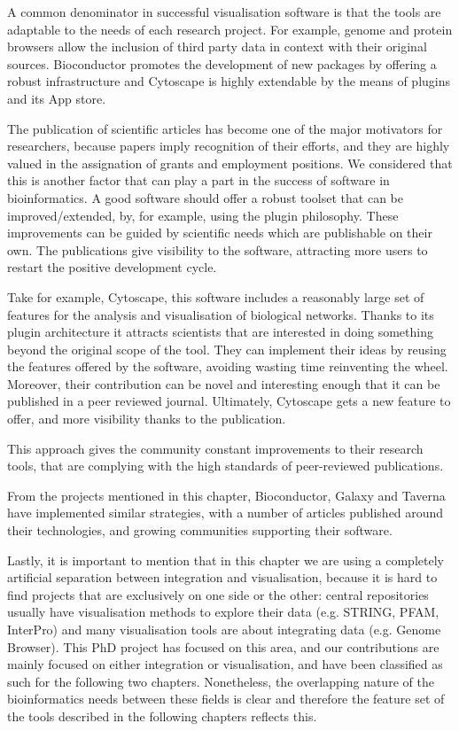 A common denominator in successful visualisation software is that the tools are adaptable to the needs of each research project. For example, genome and protein browsers allow the inclusion of third party data in context with their original sources. Bioconductor promotes the development of new packages by offering a robust infrastructure and Cytoscape is highly extendable by the means of plugins and its App store. 

The publication of scientific articles has become one of the major motivators for researchers, because papers imply recognition of their efforts, and they are highly valued in the assignation of grants and employment positions. We considered that this is another factor that can play a part in the success of software in bioinformatics. A good software should offer a robust toolset that can be improved/extended, by, for example, using the plugin philosophy. These improvements can be guided by scientific needs which are publishable on their own. The publications give visibility to the software, attracting more users to restart the positive development cycle.

Take for example, Cytoscape, this software includes a reasonably large set of features for the analysis and visualisation of biological networks. Thanks to its plugin architecture it attracts scientists that are interested in doing something beyond the original scope of the tool. They can implement their ideas by reusing the features offered by the software, avoiding wasting time reinventing the wheel. Moreover, their contribution can be novel and interesting enough that it can be published in a peer reviewed journal. Ultimately, Cytoscape gets a new feature to offer, and more visibility thanks to the publication. 

This approach gives the community constant improvements to their research tools, that are complying with the high standards of peer-reviewed publications. 

From the projects mentioned in this chapter, Bioconductor, Galaxy and Taverna have implemented similar strategies, with a number of articles published around their technologies, and growing communities supporting their software.

Lastly, it is important to mention that in this chapter we are using a completely artificial separation between integration and visualisation, because it is hard to find projects that are exclusively on one side or the other: central repositories usually have visualisation methods to explore their data (e.g. STRING, PFAM, InterPro) and many visualisation tools are about integrating data (e.g. Genome Browser). This PhD project has focused on this area, and our contributions are mainly focused on either integration or visualisation, and have been classified as such for the following two chapters. Nonetheless, the overlapping nature of the bioinformatics needs between these fields is clear and therefore the feature set of the tools described in the following chapters reflects this. 

